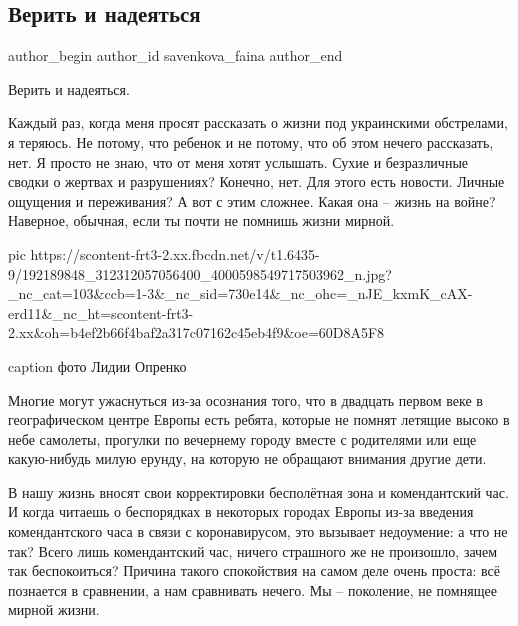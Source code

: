  
 
 
 
 
 
\subsection{Верить и надеяться}
\label{sec:30_05_2021.fb.savenkova_faina.1.verit_i_nadejatsja_donbass}
\ifcmt
 author_begin
   author_id savenkova_faina
 author_end
\fi

Верить и надеяться.

Каждый раз, когда меня просят рассказать о жизни под украинскими обстрелами, я
теряюсь. Не потому, что ребенок и не потому, что об этом нечего рассказать,
нет. Я просто не знаю, что от меня хотят услышать. Сухие и безразличные сводки
о жертвах и разрушениях? Конечно, нет. Для этого есть новости. Личные ощущения
и переживания? А вот с этим сложнее. Какая она – жизнь на войне? Наверное,
обычная, если ты почти не помнишь жизни мирной.

\ifcmt
  pic https://scontent-frt3-2.xx.fbcdn.net/v/t1.6435-9/192189848_312312057056400_4000598549717503962_n.jpg?_nc_cat=103&ccb=1-3&_nc_sid=730e14&_nc_ohc=_nJE_kxmK_cAX-erd11&_nc_ht=scontent-frt3-2.xx&oh=b4ef2b66f4baf2a317c07162c45eb4f9&oe=60D8A5F8

  caption фото Лидии Опренко
\fi

Многие могут ужаснуться из-за осознания того, что в двадцать первом веке в
географическом центре Европы есть ребята, которые не помнят летящие высоко в
небе самолеты, прогулки по вечернему городу вместе с родителями или еще
какую-нибудь милую ерунду, на которую не обращают внимания другие дети.

В нашу жизнь вносят свои корректировки бесполётная зона и комендантский час. И
когда читаешь о беспорядках в некоторых городах Европы из-за введения
комендантского часа в связи с коронавирусом, это вызывает недоумение: а что не
так? Всего лишь комендантский час, ничего страшного же не произошло, зачем так
беспокоиться?  Причина такого спокойствия на самом деле очень проста: всё
познается в сравнении, а нам сравнивать нечего. Мы – поколение, не помнящее
мирной жизни.

